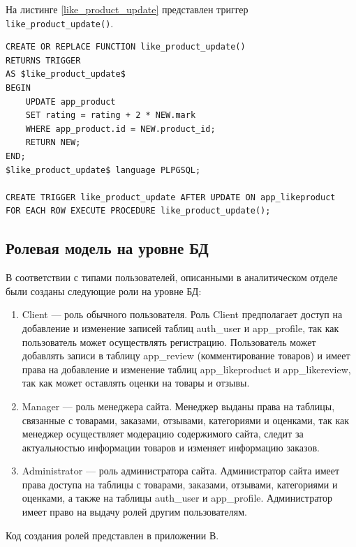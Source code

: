 На листинге \ref{like_product_update} представлен триггер \verb;like_product_update();.

\newpage

\captionsetup{singlelinecheck = false, justification=raggedright}
\begin{lstlisting}[label=like_product_update,caption=Триггер на обновление рейтинга при изменении оценки]
CREATE OR REPLACE FUNCTION like_product_update()
RETURNS TRIGGER
AS $like_product_update$
BEGIN
    UPDATE app_product
    SET rating = rating + 2 * NEW.mark
    WHERE app_product.id = NEW.product_id;
    RETURN NEW;
END;
$like_product_update$ language PLPGSQL;

CREATE TRIGGER like_product_update AFTER UPDATE ON app_likeproduct
FOR EACH ROW EXECUTE PROCEDURE like_product_update();
\end{lstlisting}

\subsection{Ролевая модель на уровне БД}

В соответствии с типами пользователей, описанными в аналитическом отделе были созданы следующие роли на уровне БД:

\begin{enumerate}
	\item Client --- роль обычного пользователя. Роль Client предполагает доступ на добавление и изменение записей таблиц auth\_user и app\_profile, так как пользователь может осуществлять регистрацию. Пользователь может добавлять записи в таблицу app\_review (комментирование товаров) и имеет права на добавление и изменение таблиц app\_likeproduct и app\_likereview, так как может оставлять оценки на товары и отзывы.
	\item Manager --- роль менеджера сайта. Менеджер выданы права на таблицы, связанные с товарами, заказами, отзывами, категориями и оценками, так как менеджер осуществляет модерацию содержимого сайта, следит за актуальностью информации товаров и изменяет информацию заказов.
	\item Administrator --- роль администратора сайта. Администратор сайта имеет права доступа на таблицы с товарами, заказами, отзывами, категориями и оценками, а также на таблицы auth\_user и app\_profile. Администратор имеет право на выдачу ролей другим пользователям.
\end{enumerate}

Код создания ролей представлен в приложении В.


